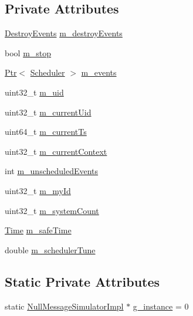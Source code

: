\subsection*{Private Attributes}
\begin{DoxyCompactItemize}
\item 
\hyperlink{classns3_1_1NullMessageSimulatorImpl_ab649c69a3c50995571fbf4f9c501fd9c}{Destroy\+Events} \hyperlink{classns3_1_1NullMessageSimulatorImpl_a9e770e3d4d880f1d5757247329a82bc5}{m\+\_\+destroy\+Events}
\item 
bool \hyperlink{classns3_1_1NullMessageSimulatorImpl_adeb2421a463e75bf70d95a72883bedca}{m\+\_\+stop}
\item 
\hyperlink{classns3_1_1Ptr}{Ptr}$<$ \hyperlink{classns3_1_1Scheduler}{Scheduler} $>$ \hyperlink{classns3_1_1NullMessageSimulatorImpl_a14c65b1864b3ad0dde4c9b6f790629e6}{m\+\_\+events}
\item 
uint32\+\_\+t \hyperlink{classns3_1_1NullMessageSimulatorImpl_a6e70eabc98d356b3be095d590c0bbc19}{m\+\_\+uid}
\item 
uint32\+\_\+t \hyperlink{classns3_1_1NullMessageSimulatorImpl_a27547b902e165fc5798972e02c3d3703}{m\+\_\+current\+Uid}
\item 
uint64\+\_\+t \hyperlink{classns3_1_1NullMessageSimulatorImpl_a82990e1ea33f62cbdad15369023c8aa3}{m\+\_\+current\+Ts}
\item 
uint32\+\_\+t \hyperlink{classns3_1_1NullMessageSimulatorImpl_a485d072ecbd4b354c8c971a448f5c819}{m\+\_\+current\+Context}
\item 
int \hyperlink{classns3_1_1NullMessageSimulatorImpl_ac7c6c7c6b33fe1015b283d7f97b15d00}{m\+\_\+unscheduled\+Events}
\item 
uint32\+\_\+t \hyperlink{classns3_1_1NullMessageSimulatorImpl_a5a16340a696af22fc8b9235104f7f308}{m\+\_\+my\+Id}
\item 
uint32\+\_\+t \hyperlink{classns3_1_1NullMessageSimulatorImpl_a3fbd7cf9c613dffe574b4a4929c75c66}{m\+\_\+system\+Count}
\item 
\hyperlink{classns3_1_1Time}{Time} \hyperlink{classns3_1_1NullMessageSimulatorImpl_a4c2c75ce1bb2369f04c678898fc83711}{m\+\_\+safe\+Time}
\item 
double \hyperlink{classns3_1_1NullMessageSimulatorImpl_a12ce7de1b437b2055825acac839073c4}{m\+\_\+scheduler\+Tune}
\end{DoxyCompactItemize}
\subsection*{Static Private Attributes}
\begin{DoxyCompactItemize}
\item 
static \hyperlink{classns3_1_1NullMessageSimulatorImpl}{Null\+Message\+Simulator\+Impl} $\ast$ \hyperlink{classns3_1_1NullMessageSimulatorImpl_a5ee455f3482718ad5064d7805b8fa5c5}{g\+\_\+instance} = 0
\end{DoxyCompactItemize}
